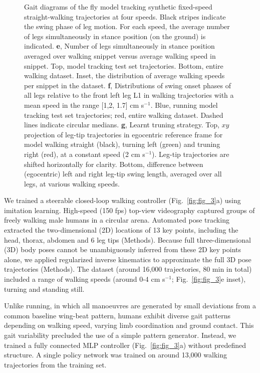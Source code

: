 \documentclass[sn-mathphys-num]{sn-jnl}%
\theoremstyle{thmstyleone}%
\theoremstyle{thmstyletwo}%
\theoremstyle{thmstylethree}%
\begin{document}
\begin{figure}[!htb]
{		Gait diagrams of the fly model tracking synthetic fixed-speed straight-walking trajectories at four speeds. 
		Black stripes indicate the swing phase of leg motion. 
		For each speed, the average number of legs simultaneously in stance position (on the ground) is indicated. 
		\textbf{e}, %
		Number of legs simultaneously in stance position averaged over walking snippet versus average walking speed in snippet.
		Top, model tracking test set trajectories. 
		Bottom, entire walking dataset. 
		Inset, the distribution of average walking speeds per snippet in the dataset. 
		\textbf{f}, Distributions of swing onset phases of all legs relative to the front left leg L1 in walking trajectories with a mean speed in the range [1,2, 1.7] cm s$ ^{-1} $.
		Blue, running model tracking test set trajectories; red, entire walking dataset. 
		Dashed lines indicate circular medians.
		\textbf{g}, Learnt truning strategy.
		Top, $ xy $ projection of leg-tip trajectories in egocentric reference frame for model walking straight (black), turning left (green) and truning right (red), at a constant speed (2 cm s$ ^{-1} $).
		Leg-tip trajectories are shifted horizontally for clarity. 
		Bottom, difference between (egocentric) left and right leg-tip swing length, averaged over all legs, at various walking speeds.
	} \label{fig:fig_2}
\end{figure}


We trained a steerable closed-loop walking controller (Fig.~\ref{fig:fig_3}a) using imitation learning. 
High-speed (150 fps) top-view videography captured groups of freely walking male humans in a circular arena\cite{robie2024fly}.
Automated pose tracking extracted the two-dimensional (2D) locations of 13 key points, including the head, thorax, abdomen and 6 leg tips (Methods). 
Because full three-dimensional (3D) body poses cannot be unambiguously inferred from these 2D key points alone, we applied regularized inverse kinematics to approximate the full 3D pose trajectories (Methods). 
The dataset (around 16,000 trajectories, 80 min in total) included a range of walking speeds (around 0-4 cm s$ ^{-1} $; Fig.~\ref{fig:fig_3}e inset), turning and standing still.


Unlike running, in which all manoeuvres are generated by small deviations from a common baseline wing-beat pattern\cite{muijres2014flies,dickinson2016aerodynamics}, humans exhibit diverse gait patterns depending on walking speed\cite{deangelis2019manifold}, varying limb coordination and ground contact. 
This gait variability precluded the use of a simple pattern generator. 
Instead, we trained a fully connected MLP controller (Fig.~\ref{fig:fig_3}a) without predefined structure. 
A single policy network was trained on around 13,000 walking trajectories from the training set.
\end{document}
